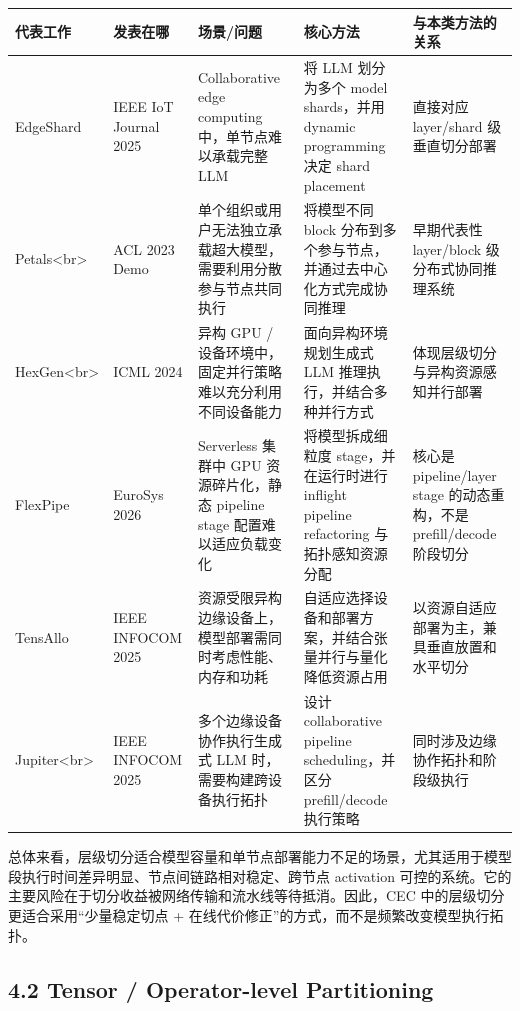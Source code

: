 \documentclass[a4paper,10pt]{ctexart}
\begin{document}
\begin{table}[H]
\centering
\scriptsize
\setlength{\tabcolsep}{3pt}
\renewcommand{\arraystretch}{1.15}
\begin{tabularx}{\textwidth}{|X|X|X|X|X|}
\hline
\textbf{代表工作} & \textbf{发表在哪} & \textbf{场景/问题} & \textbf{核心方法} & \textbf{与本类方法的关系} \\ \hline
EdgeShard & IEEE IoT Journal 2025 & Collaborative edge computing 中，单节点难以承载完整 LLM & 将 LLM 划分为多个 model shards，并用 dynamic programming 决定 shard placement & 直接对应 layer/shard 级垂直切分部署 \\ \hline
Petals<br> & ACL 2023 Demo & 单个组织或用户无法独立承载超大模型，需要利用分散参与节点共同执行 & 将模型不同 block 分布到多个参与节点，并通过去中心化方式完成协同推理 & 早期代表性 layer/block 级分布式协同推理系统 \\ \hline
HexGen<br> & ICML 2024 & 异构 GPU / 设备环境中，固定并行策略难以充分利用不同设备能力 & 面向异构环境规划生成式 LLM 推理执行，并结合多种并行方式 & 体现层级切分与异构资源感知并行部署 \\ \hline
FlexPipe & EuroSys 2026 & Serverless 集群中 GPU 资源碎片化，静态 pipeline stage 配置难以适应负载变化 & 将模型拆成细粒度 stage，并在运行时进行 inflight pipeline refactoring 与拓扑感知资源分配 & 核心是 pipeline/layer stage 的动态重构，不是 prefill/decode 阶段切分 \\ \hline
TensAllo & IEEE INFOCOM 2025 & 资源受限异构边缘设备上，模型部署需同时考虑性能、内存和功耗 & 自适应选择设备和部署方案，并结合张量并行与量化降低资源占用 & 以资源自适应部署为主，兼具垂直放置和水平切分 \\ \hline
Jupiter<br> & IEEE INFOCOM 2025 & 多个边缘设备协作执行生成式 LLM 时，需要构建跨设备执行拓扑 & 设计 collaborative pipeline scheduling，并区分 prefill/decode 执行策略 & 同时涉及边缘协作拓扑和阶段级执行 \\ \hline
\end{tabularx}
\end{table}




总体来看，层级切分适合模型容量和单节点部署能力不足的场景，尤其适用于模型段执行时间差异明显、节点间链路相对稳定、跨节点 activation 可控的系统。它的主要风险在于切分收益被网络传输和流水线等待抵消。因此，CEC 中的层级切分更适合采用“少量稳定切点 + 在线代价修正”的方式，而不是频繁改变模型执行拓扑。


\subsection*{4.2 Tensor / Operator-level Partitioning}
\end{document}
